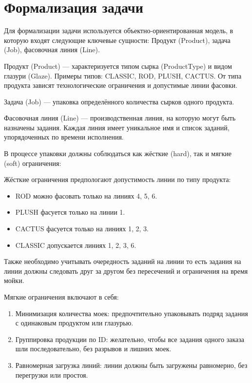 \section{Формализация задачи}

Для формализации задачи используется объектно-ориентированная модель, в которую входят следующие ключевые сущности: Продукт (Product), задача (Job),  фасовочная линия (Line).

Продукт (Product) — характеризуется типом сырка (ProductType) и видом глазури (Glaze). Примеры типов: CLASSIC, ROD, PLUSH, CACTUS. От типа продукта зависят технологические ограничения и допустимые линии фасовки.

Задача (Job) — упаковка определённого количества сырков одного продукта.

Фасовочная линия (Line) — производственная линия, на которую могут быть назначены задания. Каждая линия имеет уникальное имя и список заданий, упорядоченных по времени исполнения.

В процессе упаковки должны соблюдаться как жёсткие (hard), так и мягкие (soft) ограничения:

Жёсткие ограничения предпологают допустимость линии по типу продукта:
\begin{itemize}
        \item ROD можно фасовать только на линиях 4, 5, 6.
        \item PLUSH фасуется только на линии 1.
        \item CACTUS фасуется только на линиях 1, 2, 3.
        \item CLASSIC допускается линиях 1, 2, 3, 6.
\end{itemize}

Также необходимо учитывать очередность заданий на линии то есть задания на линии должны следовать друг за другом без пересечений и ограничения на время мойки.

Мягкие ограничения включают в себя:

\begin{enumerate}
    \item Минимизация количества моек: предпочтительно упаковывать подряд задания с одинаковым продуктом или глазурью.
    \item Группировка продукции по ID: желательно, чтобы все задания одного заказа шли последовательно, без разрывов и лишних моек.
    \item Равномерная загрузка линий: линии должны быть загружены равномерно, без перегрузки или простоя.
\end{enumerate}


